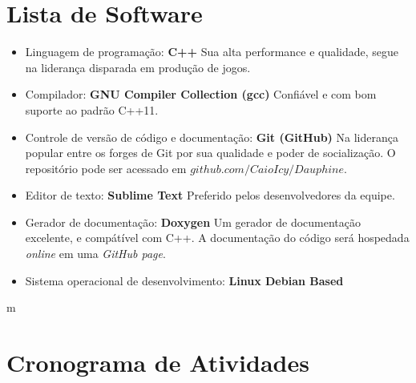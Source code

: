 \section{Lista de Software}

\begin{itemize}
\item{Linguagem de programação:} \textbf{C++}
Sua alta performance e qualidade, segue na liderança disparada em produção de jogos.
\item{Compilador:} \textbf{GNU Compiler Collection (gcc)}
Confiável e com bom suporte ao padrão C++11.
\item{Controle de versão de código e documentação:} \textbf{Git (GitHub)}
Na liderança popular entre os forges de Git por sua qualidade e poder de socialização. O repositório pode ser acessado em $github.com/CaioIcy/Dauphine$.
\item{Editor de texto:} \textbf{Sublime Text}
Preferido pelos desenvolvedores da equipe.
\item{Gerador de documentação:} \textbf{Doxygen}
Um gerador de documentação excelente, e compátível com C++. A documentação do código será hospedada \textit{online} em uma \textit{GitHub page}.
\item{Sistema operacional de desenvolvimento:} \textbf{Linux Debian Based}
\end{itemize}
m
\section{Cronograma de Atividades}
